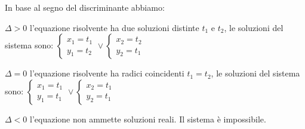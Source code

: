 In base al segno del discriminante abbiamo:
\begin{itemize*}
\item $\Delta >0$ l'equazione risolvente ha due soluzioni distinte $ t_1 $ e $ 
t_2 $, le soluzioni del sistema sono: 
$\left\{\begin{array}{l}{x_1=t_1}\\{y_1=t_2}\end{array}\right.\vee 
\left\{\begin{array}{l}{x_2=t_2}\\{y_2=t_1}\end{array}\right.$
\item $\Delta =0$ l'equazione risolvente ha radici coincidenti $t_1=t_2$, le 
soluzioni del sistema sono: 
$\left\{\begin{array}{l}{x_1=t_1}\\{y_1=t_1}\end{array}\right.\vee 
\left\{\begin{array}{l}{x_2=t_1}\\{y_2=t_1}\end{array}\right.$
\item $\Delta <0$ l'equazione non ammette soluzioni reali. Il sistema è 
impossibile.
\end{itemize*}

